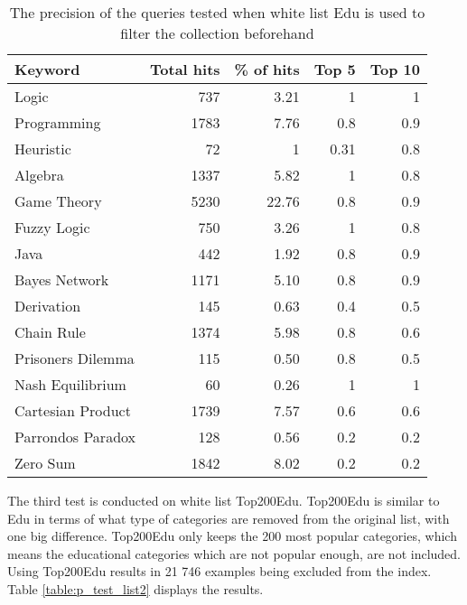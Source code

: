 \begin{table}[H]
\centering
\begin{tabular} {|| p{10em} | r | r | r | r ||} 
 \hline
 Keyword & Total hits & \% of hits & Top 5 & Top 10 \\ [0.5ex] 
 \hline

Logic & 737 & 3.21 & 1 & 1 \\
Programming & 1783 & 7.76 & 0.8 & 0.9 \\
Heuristic & 72 & 1 & 0.31 & 0.8 \\
Algebra & 1337 & 5.82 & 1 & 0.8 \\
Game Theory & 5230 & 22.76 & 0.8 & 0.9 \\
\hline
Fuzzy Logic & 750 & 3.26 & 1 & 0.8 \\
Java & 442 & 1.92 & 0.8 & 0.9 \\
Bayes Network & 1171 & 5.10 & 0.8 & 0.9 \\
Derivation & 145 & 0.63 & 0.4 & 0.5 \\
\hline
Chain Rule & 1374 & 5.98 & 0.8 & 0.6 \\
Prisoners Dilemma & 115 & 0.50 & 0.8 & 0.5 \\
Nash Equilibrium & 60 & 0.26 & 1 & 1 \\
Cartesian Product & 1739 & 7.57 & 0.6 & 0.6 \\
Parrondos Paradox & 128 & 0.56 & 0.2 & 0.2 \\
Zero Sum & 1842 & 8.02 & 0.2 & 0.2 \\

 \hline
\end{tabular}
\caption{The precision of the queries tested when white list Edu is used to filter the collection beforehand}
\label{table:p_test_list1}
\end{table}

The third test is conducted on white list Top200Edu. Top200Edu is similar to Edu in terms of what type of categories are removed from the original list, with one big difference. Top200Edu only keeps the 200 most popular categories, which means the educational categories which are not popular enough, are not included. Using Top200Edu results in 21 746 examples being excluded from the index. Table \ref{table:p_test_list2} displays the results.

